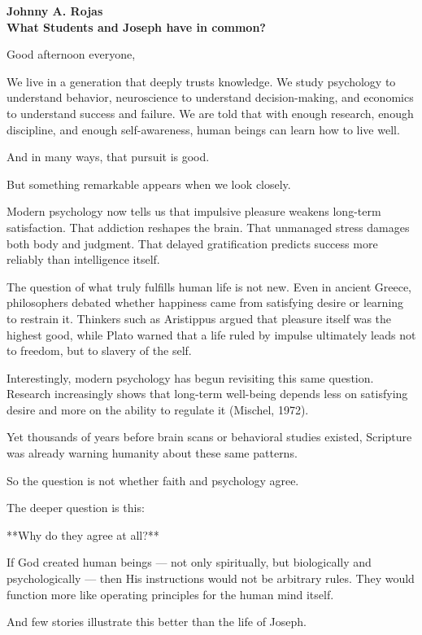 \documentclass[12pt]{article}
\begin{document}
\begin{center}
    {\textbf{Johnny A. Rojas}}\\
    {\Large \textbf{What Students and Joseph have in common?}}
\end{center}

Good afternoon everyone,

We live in a generation that deeply trusts knowledge.
We study psychology to understand behavior, neuroscience to understand decision-making, and economics to understand success and failure. We are told that with enough research, enough discipline, and enough self-awareness, human beings can learn how to live well.

And in many ways, that pursuit is good.

But something remarkable appears when we look closely.

Modern psychology now tells us that impulsive pleasure weakens long-term satisfaction. That addiction reshapes the brain. That unmanaged stress damages both body and judgment. That delayed gratification predicts success more reliably than intelligence itself.

The question of what truly fulfills human life is not new. Even in ancient Greece, philosophers debated whether happiness came from satisfying desire or learning to restrain it. Thinkers such as Aristippus argued that pleasure itself was the highest good, while Plato warned that a life ruled by impulse ultimately leads not to freedom, but to slavery of the self.

Interestingly, modern psychology has begun revisiting this same question. Research increasingly shows that long-term well-being depends less on satisfying desire and more on the ability to regulate it (Mischel, 1972).

Yet thousands of years before brain scans or behavioral studies existed, Scripture was already warning humanity about these same patterns.

So the question is not whether faith and psychology agree.

The deeper question is this:

**Why do they agree at all?**

If God created human beings — not only spiritually, but biologically and psychologically — then His instructions would not be arbitrary rules. They would function more like operating principles for the human mind itself.

And few stories illustrate this better than the life of Joseph.
\end{document}
